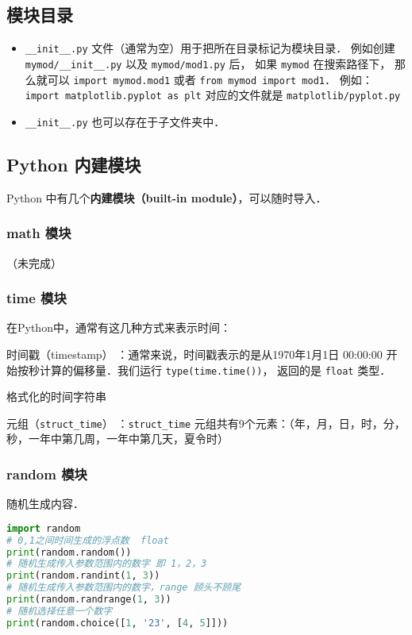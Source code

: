 \subsection{模块目录}
\begin{itemize}
\item \verb|__init__.py| 文件（通常为空）用于把所在目录标记为模块目录． 例如创建 \verb|mymod/__init__.py| 以及 \verb|mymod/mod1.py| 后， 如果 \verb|mymod| 在搜索路径下， 那么就可以 \verb|import mymod.mod1| 或者 \verb|from mymod import mod1|． 例如： \verb|import matplotlib.pyplot as plt| 对应的文件就是 \verb|matplotlib/pyplot.py|
\item \verb|__init__.py| 也可以存在于子文件夹中．
\end{itemize}

\subsection{Python 内建模块}
Python 中有几个\textbf{内建模块（built-in module）}，可以随时导入．

\subsubsection{math 模块}
（未完成）

\subsubsection{time 模块}
在Python中，通常有这几种方式来表示时间：

时间戳（timestamp） ：通常来说，时间戳表示的是从1970年1月1日 00:00:00 开始按秒计算的偏移量．我们运行 \verb|type(time.time())|， 返回的是 \verb|float| 类型．

格式化的时间字符串

元组（\verb|struct_time|） ：\verb|struct_time| 元组共有9个元素：（年，月，日，时，分，秒，一年中第几周，一年中第几天，夏令时）

\subsubsection{random 模块}
随机生成内容．
\begin{lstlisting}[language=python]
import random
# 0,1之间时间生成的浮点数  float
print(random.random())
# 随机生成传入参数范围内的数字 即 1，2，3
print(random.randint(1, 3))
# 随机生成传入参数范围内的数字，range 顾头不顾尾
print(random.randrange(1, 3))
# 随机选择任意一个数字
print(random.choice([1, '23', [4, 5]]))
\end{lstlisting}

